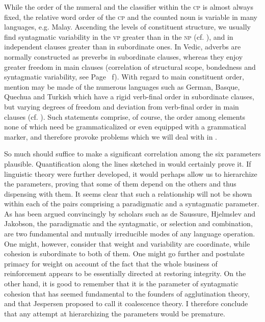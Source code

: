 \noindent While the order of the numeral and the classifier within the \textsc{cp} is almost always fixed, the relative word order of the \textsc{cp} and the counted noun is variable in many languages, e.g. Malay. Ascending the levels of constituent structure, we usually find syntagmatic variability in the \textsc{vp} greater than in the \textsc{np} (cf. \citealt[92f]{Givón1975}), and in independent clauses greater than in subordinate ones. In Vedic, adverbs are normally constructed as preverbs in subordinate clauses, whereas they enjoy greater freedom in main clauses (correlation of structural scope, bondedness and syntagmatic variability, see Page~\pageref{page106}\chk%
f). With regard to main constituent order, mention may be made of the numerous languages such as German, Basque, Quechua and Turkish which have a rigid verb-final order in subordinate clauses, but varying degrees of freedom and deviation from verb-final order in main clauses (cf. \citealt{Ross1973}). Such statements comprise, of course, the order among elements none of which need be grammaticalized or even equipped with a grammatical marker, and therefore provoke problems which we will deal with in .


 


So much should suffice to make a significant correlation among the six parameters plausible. Quantification along the lines sketched in  would certainly prove it. If linguistic theory were further developed, it would perhaps allow us to hierarchize the parameters, proving that some of them depend on the others and thus dispensing with them. It seems clear that such a relationship will not be shown within each of the pairs comprising a paradigmatic and a syntagmatic parameter. As has been argued convincingly by scholars such as de Saussure, Hjelmslev and Jakobson, the paradigmatic and the syntagmatic, or selection and combination, are two fundamental and mutually irreducible modes of any language operation. One might, however, consider that weight and variability are coordinate, while cohesion is subordinate to both of them. One might go further and postulate primacy for weight on account of the fact that the whole business of reinforcement appears to be essentially directed at restoring integrity. On the other hand, it is good to remember that it is the parameter of syntagmatic cohesion that has seemed fundamental to the founders of agglutination theory, and that Jespersen proposed to call it coalescence theory. I therefore conclude that any attempt at hierarchizing the parameters would be premature.

